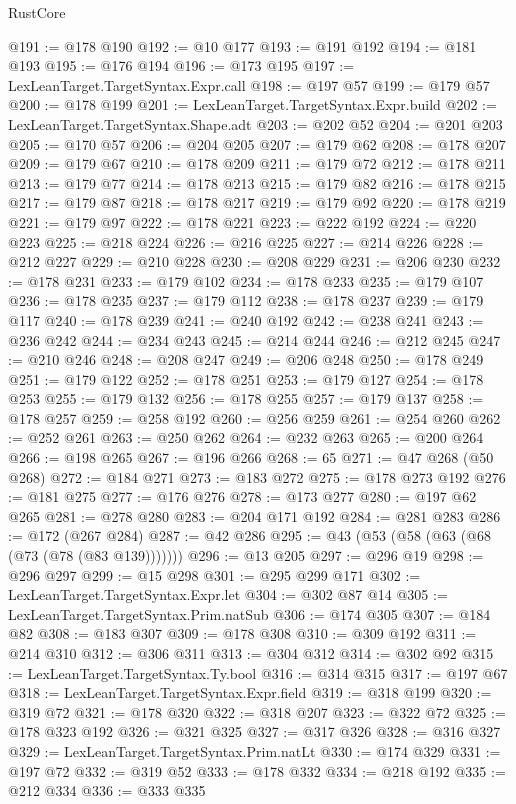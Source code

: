 \begin{lexlean}{RustCore}
\begin{coremodule}
@191 := @178 @190
@192 := @10 @177
@193 := @191 @192
@194 := @181 @193
@195 := @176 @194
@196 := @173 @195
@197 := LexLeanTarget.TargetSyntax.Expr.call
@198 := @197 @57
@199 := @179 @57
@200 := @178 @199
@201 := LexLeanTarget.TargetSyntax.Expr.build
@202 := LexLeanTarget.TargetSyntax.Shape.adt
@203 := @202 @52
@204 := @201 @203
@205 := @170 @57
@206 := @204 @205
@207 := @179 @62
@208 := @178 @207
@209 := @179 @67
@210 := @178 @209
@211 := @179 @72
@212 := @178 @211
@213 := @179 @77
@214 := @178 @213
@215 := @179 @82
@216 := @178 @215
@217 := @179 @87
@218 := @178 @217
@219 := @179 @92
@220 := @178 @219
@221 := @179 @97
@222 := @178 @221
@223 := @222 @192
@224 := @220 @223
@225 := @218 @224
@226 := @216 @225
@227 := @214 @226
@228 := @212 @227
@229 := @210 @228
@230 := @208 @229
@231 := @206 @230
@232 := @178 @231
@233 := @179 @102
@234 := @178 @233
@235 := @179 @107
@236 := @178 @235
@237 := @179 @112
@238 := @178 @237
@239 := @179 @117
@240 := @178 @239
@241 := @240 @192
@242 := @238 @241
@243 := @236 @242
@244 := @234 @243
@245 := @214 @244
@246 := @212 @245
@247 := @210 @246
@248 := @208 @247
@249 := @206 @248
@250 := @178 @249
@251 := @179 @122
@252 := @178 @251
@253 := @179 @127
@254 := @178 @253
@255 := @179 @132
@256 := @178 @255
@257 := @179 @137
@258 := @178 @257
@259 := @258 @192
@260 := @256 @259
@261 := @254 @260
@262 := @252 @261
@263 := @250 @262
@264 := @232 @263
@265 := @200 @264
@266 := @198 @265
@267 := @196 @266
@268 := 65
@271 := @47 @268 (@50 @268)
@272 := @184 @271
@273 := @183 @272
@275 := @178 @273 @192
@276 := @181 @275
@277 := @176 @276
@278 := @173 @277
@280 := @197 @62 @265
@281 := @278 @280
@283 := @204 @171 @192
@284 := @281 @283
@286 := @172 (@267 @284)
@287 := @42 @286
@295 := @43 (@53 (@58 (@63 (@68 (@73 (@78 (@83 @139)))))))
@296 := @13 @205
@297 := @296 @19
@298 := @296 @297
@299 := @15 @298
@301 := @295 @299 @171
@302 := LexLeanTarget.TargetSyntax.Expr.let
@304 := @302 @87 @14
@305 := LexLeanTarget.TargetSyntax.Prim.natSub
@306 := @174 @305
@307 := @184 @82
@308 := @183 @307
@309 := @178 @308
@310 := @309 @192
@311 := @214 @310
@312 := @306 @311
@313 := @304 @312
@314 := @302 @92
@315 := LexLeanTarget.TargetSyntax.Ty.bool
@316 := @314 @315
@317 := @197 @67
@318 := LexLeanTarget.TargetSyntax.Expr.field
@319 := @318 @199
@320 := @319 @72
@321 := @178 @320
@322 := @318 @207
@323 := @322 @72
@325 := @178 @323 @192
@326 := @321 @325
@327 := @317 @326
@328 := @316 @327
@329 := LexLeanTarget.TargetSyntax.Prim.natLt
@330 := @174 @329
@331 := @197 @72
@332 := @319 @52
@333 := @178 @332
@334 := @218 @192
@335 := @212 @334
@336 := @333 @335

\end{coremodule}
\end{lexlean}
